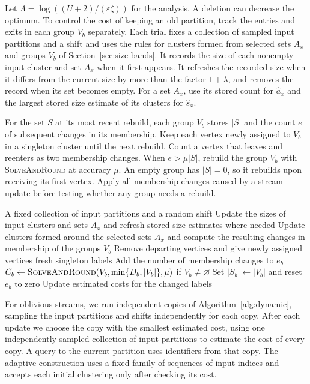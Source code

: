 \documentclass[11pt]{article}
\newcommand{\BandSeed}{\textup{\textsc{SolveAndRound}}}
\begin{document}
Let $\Lambda=\log((U+2)/(\varepsilon\zeta))$ for the analysis.
A deletion can decrease the optimum. To control the cost of keeping
an old partition, track the entries and exits in each group $V_b$ separately.
Each trial fixes a collection of sampled input partitions and a shift and uses the rules for clusters formed
from selected sets $A_x$ and
groups $V_b$ of Section~\ref{sec:size-bands}. It records the size of each
nonempty input cluster and set $A_x$ when it first appears. It refreshes the
recorded size when it differs from the current size by more than the
factor $1+\lambda$, and removes the record when its set becomes empty. For a set $A_x$, use its
stored count for $\widehat a_x$ and the largest stored size estimate of
its clusters for $\widehat s_x$.

For the set $S$ at its most recent rebuild, each group $V_b$ stores $|S|$
and the count $e$ of subsequent changes in its membership. Keep each vertex newly assigned to $V_b$ in a singleton cluster until
the next rebuild. Count a vertex that leaves and reenters as two membership changes. When $e>\mu|S|$, rebuild
the group $V_b$ with \BandSeed{} at accuracy $\mu$. An empty group has $|S|=0$, so it
rebuilds upon receiving its first vertex. Apply all membership changes caused by a stream
update before testing
whether any group needs a rebuild.

\begin{algorithm}[htbp]
\caption{Maintaining one trial under vertex updates}
\label{alg:dynamic}
\begin{algorithmic}[1]
\Require A fixed collection of input partitions and a random shift
    \State Update the sizes of input clusters and sets $A_x$ and refresh stored size estimates where needed
    \State Update clusters formed around the selected sets $A_x$ and compute the resulting changes in membership of the groups $V_b$
        \State Remove departing vertices and give newly assigned vertices fresh singleton labels
        \State Add the number of membership changes to $e_b$
            \State $C_b\gets\BandSeed(V_b,\min\{D_b,|V_b|\},\mu)$ if $V_b\ne\varnothing$
            \State Set $|S_b|\gets |V_b|$ and reset $e_b$ to zero
        \EndIf
    \EndFor
    \State Update estimated costs for the changed labels
\EndFor
\end{algorithmic}
\end{algorithm}

For oblivious streams, we run independent copies of
Algorithm~\ref{alg:dynamic}, sampling the input partitions and shifts independently for each copy.
After each update we choose the copy with the smallest estimated cost, using one
independently sampled collection
of input partitions to estimate the cost of every copy. A query to the current partition
uses identifiers from that copy.
The adaptive construction uses a fixed family of sequences of input indices and accepts
each initial clustering only after checking its cost.
\end{document}
